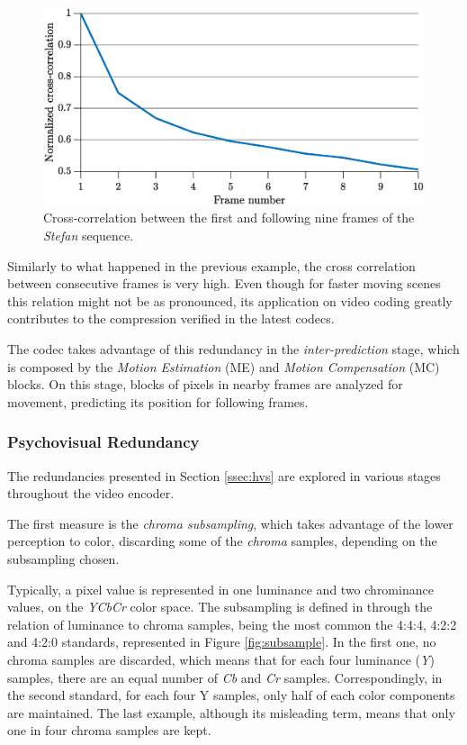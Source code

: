 \begin{figure}[h]
    \centering
    \includegraphics[width=\textwidth]{Sections/2AV1/Diagrams/intercorr.eps}
    \caption{Cross-correlation between the first and following nine frames of the \emph{Stefan} sequence.}
    \label{fig:crosscorr}
\end{figure}

Similarly to what happened in the previous example, the cross correlation between consecutive frames is very high. Even though for faster moving scenes this relation might not be as pronounced, its application on video coding greatly contributes to the compression verified in the latest codecs. 

The codec takes advantage of this redundancy in the \emph{inter-prediction} stage, which is composed by the \emph{Motion Estimation} (ME) and \emph{Motion Compensation} (MC) blocks. On this stage, blocks of pixels in nearby frames are analyzed for movement, predicting its position for following frames.

\subsubsection{Psychovisual Redundancy}

The redundancies presented in Section \ref{ssec:hvs} are explored in various stages throughout the video encoder.

The first measure is the \emph{chroma subsampling}, which takes advantage of the lower perception to color, discarding some of the \emph{chroma} samples, depending on the subsampling chosen.

Typically, a pixel value is represented in one luminance and two chrominance values, on the \emph{YCbCr} color space. The subsampling is defined in through the relation of luminance to chroma samples, being the most common the 4:4:4, 4:2:2 and 4:2:0 standards, represented in Figure \ref{fig:subsample}. In the first one, no chroma samples are discarded, which means that for each four luminance (\emph{Y}) samples, there are an equal number of \emph{Cb} and \emph{Cr} samples. Correspondingly, in the second standard, for each four Y samples, only half of each color components are maintained. The last example, although its misleading term, means that only one in four chroma samples are kept.

